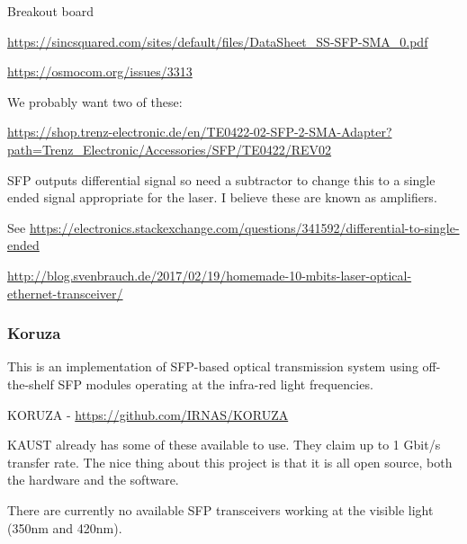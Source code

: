Breakout board

\url{https://sincsquared.com/sites/default/files/DataSheet_SS-SFP-SMA_0.pdf}

\url{https://osmocom.org/issues/3313}

We probably want two of these:

\url{https://shop.trenz-electronic.de/en/TE0422-02-SFP-2-SMA-Adapter?path=Trenz_Electronic/Accessories/SFP/TE0422/REV02}

\ac{SFP} outputs differential signal so need a subtractor to change this to
a single ended signal appropriate for the laser. I believe these are known as
amplifiers.

See \url{https://electronics.stackexchange.com/questions/341592/differential-to-single-ended}

\url{http://blog.svenbrauch.de/2017/02/19/homemade-10-mbits-laser-optical-ethernet-transceiver/}

\subsubsection{Koruza}
This is an implementation of \ac{SFP}-based optical transmission system using
off-the-shelf \ac{SFP} modules operating at the infra-red light frequencies.

KORUZA - \url{https://github.com/IRNAS/KORUZA}

\ac{KAUST} already has some of these available to use. They claim up to
1 Gbit/s transfer rate. The nice thing about this project is that it is
all open source, both the hardware and the software.

There are currently no available \ac{SFP} transceivers working at the visible
light (350nm and 420nm).
